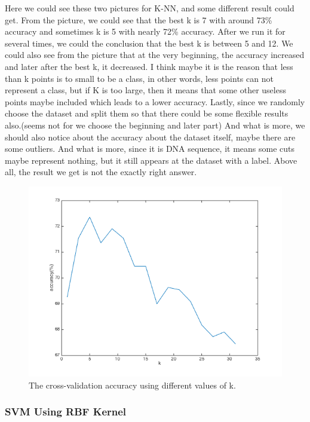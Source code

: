 \documentclass[]{article}
\begin{document}
Here we could see these two pictures for K-NN, and some different result could get. 
From the picture, we could see that the best k is 7 with around 73\% accuracy and sometimes k is 5 with nearly 72\% accuracy. After we run it for several times, we could the conclusion that the best k is between 5 and 12.
We could also see from the picture that at the very beginning, the accuracy increased and later after the best k, it decreased. I think maybe it is the reason that less than k points is to small to be a class, in other words, less points can not represent a class, but if K is too large, then it means that some other useless points maybe included which leads to a lower accuracy. Lastly, since we randomly choose the dataset and split them so that there could be some flexible results also.(seems not for we choose the beginning and later part)
And what is more, we should also notice about the accuracy about the dataset itself, maybe there are some outliers. And what is more, since it is DNA sequence, it means some cuts maybe represent nothing, but it still appears at the dataset with a label. Above all, the result we get is not the exactly right answer.


\begin{figure}[h]
\centering
  \includegraphics[width=1\linewidth]{../images/K-NN}
  \caption{The cross-validation accuracy using different values of k.}
  \label{fig:K-NN}

\end{figure}

\subsubsection{SVM Using RBF Kernel}
\end{document}
